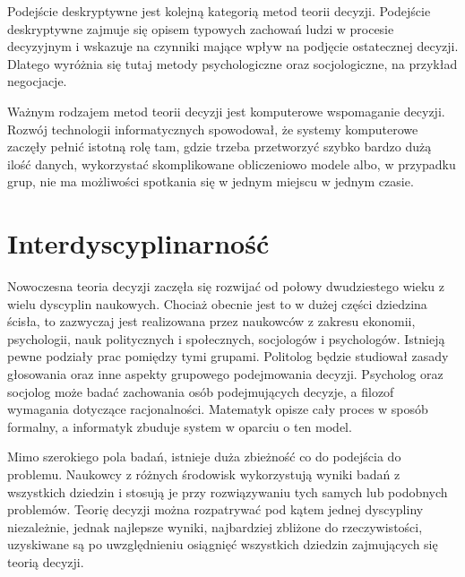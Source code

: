 Podejście deskryptywne jest kolejną kategorią metod teorii decyzji. Podejście 
deskryptywne zajmuje się opisem typowych zachowań ludzi w procesie decyzyjnym i 
wskazuje na czynniki mające wpływ na podjęcie ostatecznej decyzji. Dlatego 
wyróżnia się tutaj metody psychologiczne oraz socjologiczne, na przykład 
negocjacje.

Ważnym rodzajem metod teorii decyzji jest komputerowe wspomaganie decyzji. 
Rozwój technologii informatycznych spowodował, że systemy komputerowe zaczęły 
pełnić istotną rolę tam, gdzie trzeba przetworzyć szybko bardzo dużą ilość 
danych, wykorzystać skomplikowane obliczeniowo modele albo, w przypadku grup, 
nie ma możliwości spotkania się w jednym miejscu w jednym czasie.

\section{Interdyscyplinarność}
Nowoczesna teoria decyzji zaczęła się rozwijać od połowy dwudziestego wieku z 
wielu dyscyplin naukowych. Chociaż obecnie jest to w dużej części dziedzina 
ścisła, to zazwyczaj jest realizowana przez naukowców z zakresu ekonomii, 
psychologii, nauk politycznych i społecznych, socjologów i psychologów. 
Istnieją pewne podziały prac pomiędzy tymi grupami. Politolog będzie studiował 
zasady głosowania oraz inne aspekty grupowego podejmowania decyzji. Psycholog 
oraz socjolog może badać zachowania osób podejmujących decyzje, a filozof 
wymagania dotyczące racjonalności. Matematyk opisze cały proces w sposób 
formalny, a informatyk zbuduje system w oparciu o ten model.

Mimo szerokiego pola badań, istnieje duża zbieżność co do podejścia do problemu.
Naukowcy z różnych środowisk wykorzystują wyniki badań z wszystkich dziedzin i 
stosują je przy rozwiązywaniu tych samych lub podobnych problemów. Teorię 
decyzji można rozpatrywać pod kątem jednej dyscypliny niezależnie, jednak 
najlepsze wyniki, najbardziej zbliżone do rzeczywistości, uzyskiwane są po 
uwzględnieniu osiągnięć wszystkich dziedzin zajmujących się teorią decyzji.

